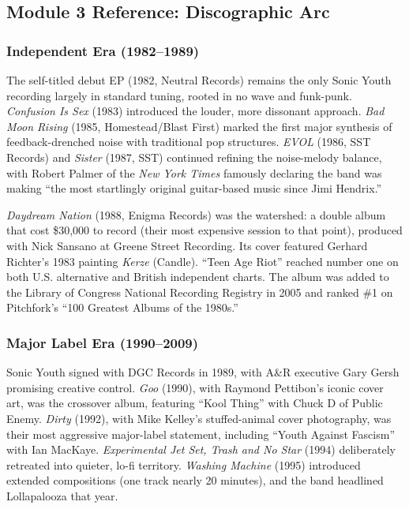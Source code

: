\documentclass[11pt,letterpaper]{article}
\begin{document}
\subsection{Module 3 Reference: Discographic Arc}

\subsubsection{Independent Era (1982--1989)}

The self-titled debut EP (1982, Neutral Records) remains the only Sonic Youth recording largely in standard tuning, rooted in no wave and funk-punk. \textit{Confusion Is Sex} (1983) introduced the louder, more dissonant approach. \textit{Bad Moon Rising} (1985, Homestead/Blast First) marked the first major synthesis of feedback-drenched noise with traditional pop structures. \textit{EVOL} (1986, SST Records) and \textit{Sister} (1987, SST) continued refining the noise-melody balance, with Robert Palmer of the \textit{New York Times} famously declaring the band was making ``the most startlingly original guitar-based music since Jimi Hendrix.''

\textit{Daydream Nation} (1988, Enigma Records) was the watershed: a double album that cost \$30,000 to record (their most expensive session to that point), produced with Nick Sansano at Greene Street Recording. Its cover featured Gerhard Richter's 1983 painting \textit{Kerze} (Candle). ``Teen Age Riot'' reached number one on both U.S. alternative and British independent charts. The album was added to the Library of Congress National Recording Registry in 2005 and ranked \#1 on Pitchfork's ``100 Greatest Albums of the 1980s.''

\subsubsection{Major Label Era (1990--2009)}

Sonic Youth signed with DGC Records in 1989, with A\&R executive Gary Gersh promising creative control. \textit{Goo} (1990), with Raymond Pettibon's iconic cover art, was the crossover album, featuring ``Kool Thing'' with Chuck D of Public Enemy. \textit{Dirty} (1992), with Mike Kelley's stuffed-animal cover photography, was their most aggressive major-label statement, including ``Youth Against Fascism'' with Ian MacKaye. \textit{Experimental Jet Set, Trash and No Star} (1994) deliberately retreated into quieter, lo-fi territory. \textit{Washing Machine} (1995) introduced extended compositions (one track nearly 20 minutes), and the band headlined Lollapalooza that year.
\end{document}
